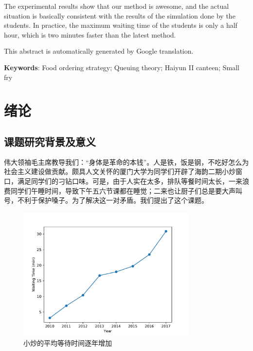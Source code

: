 \documentclass[a4paper,12pt]{book} %
\begin{document}
The experimental results show that our method is awesome, and the actual situation is basically consistent with the results of the simulation done by the students. In practice, the maximum waiting time of the students is only a half hour, which is two minutes faster than the latest method.

This abstract is automatically generated by Google translation.
\newline

\textbf{Keywords}: Food ordering strategy; Queuing theory; Haiyun II canteen; Small fry

\clearpage{\pagestyle{empty}\cleardoublepage}


\tableofcontents

\clearpage{\pagestyle{empty}\cleardoublepage}


\tableofengcontents

\clearpage{\pagestyle{empty}\cleardoublepage}



\mainmatter

\chapter{绪论}

\section{课题研究背景及意义}

伟大领袖毛主席教导我们：“身体是革命的本钱”\cite{momo2003}。人是铁，饭是钢，不吃好怎么为社会主义建设做贡献。颇具人文关怀的厦门大学为同学们开辟了海韵二期小炒窗口，满足同学们的刁钻口味。可是，由于人实在太多，排队等餐时间太长，一来浪费同学们午睡时间，导致下午五六节课都在睡觉；二来也让厨子们总是要大声叫号，不利于保护嗓子。为了解决这一对矛盾。我们提出了这个课题。

\begin{figure}[htbp]
\centering
\includegraphics[width=0.8\textwidth]{sample_pic.pdf}
\caption{小炒的平均等待时间逐年增加}
\label{growth}
\end{figure}
\end{document}
